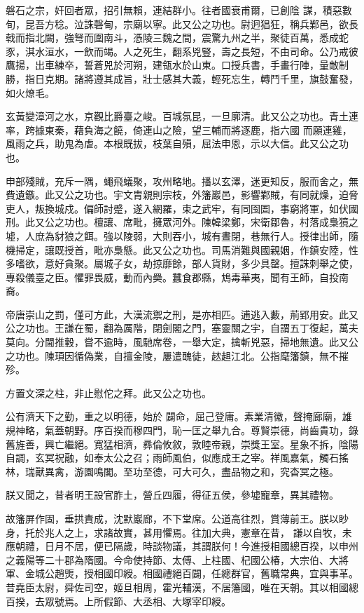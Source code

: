 \begin{pinyinscope}
 磐石之宗，奸回者眾，招引無賴，連結群小。往者國衰甫爾，已創陰
 謀，積惡數旬，昆吾方稔。泣誅磬甸，宗廟以寧。此又公之功也。尉迥猖狂，稱兵鄴邑，欲長戟而指北闕，強弩而圍南斗，憑陵三魏之間，震驚九州之半，聚徒百萬，悉成蛇豕，淇水洹水，一飲而竭。人之死生，翻系兇豎，壽之長短，不由司命。公乃戒彼鷹揚，出車練卒，誓蒼兕於河朔，建瓴水於山東。口授兵書，手畫行陣，量敵制勝，指日克期。諸將遵其成旨，壯士感其大義，輕死忘生，轉鬥千里，旗鼓奮發，如火燎毛。



 玄黃變漳河之水，京觀比爵臺之峻。百城氛昆，一旦廓清。此又公之功也。青土連率，跨據東秦，藉負海之饒，倚連山之險，望三輔而將逐鹿，指六國
 而願連雞，風雨之兵，助鬼為虐。本根既拔，枝葉自殞，屈法申恩，示以大信。此又公之功也。



 申部殘賊，充斥一隅，蠅飛蟻聚，攻州略地。播以玄澤，迷更知反，服而舍之，無費遺鏃。此又公之功也。宇文胄親則宗枝，外籓巖邑，影響鄴賊，有同就燥，迫脅吏人，叛換城戍。偏師討蹙，遂入網羅，束之武牢，有同囹圄，事窮將軍，如伏國刑。此又公之功也。檀讓、席毗，擁眾河外。陳韓梁鄭，宋衛鄒魯，村落成梟獍之墟，人庶為豺狼之餌。強以陵弱，大則吞小，城有晝閉，巷無行人。授律出師，隨機掃定，讓既授首，毗亦梟懸。此又公之功也。司馬消難與國親姻，作鎮安陸，性
 多嗜欲，意好貪聚。屬城子女，劫掠靡餘，部人貨財，多少具罄。擅誅刺舉之使，專殺儀臺之臣。懼罪畏威，動而內奰。蠶食郡縣，鴆毒華夷，聞有王師，自投南裔。



 帝唐崇山之罰，僅可方此，大漢流禦之刑，是亦相匹。逋逃入藪，荊郢用安。此又公之功也。王謙在蜀，翻為厲階，閉劍閣之門，塞靈關之宇，自謂五丁復起，萬夫莫向。分閫推轂，嘗不逾時，風馳席卷，一舉大定，擒斬兇惡，掃地無遺。此又公之功也。陳頊因循偽業，自擅金陵，屢遣醜徒，趑趄江北。公指麾籓鎮，無不摧殄。



 方置文深之柱，非止慰佗之拜。此又公之功也。



 公有濟天下之勤，重之以明德，始於
 闢命，屈己登庸。素業清徽，聲掩廊廟，雄規神略，氣蓋朝野。序百揆而穆四門，恥一匡之舉九合。尊賢崇德，尚齒貴功，錄舊旌善，興亡繼絕。寬猛相濟，彞倫攸敘，敦睦帝親，崇獎王室。星象不拆，陰陽自調，玄冥祝融，如奉太公之召；雨師風伯，似應成王之宰。祥風嘉氣，觸石搖林，瑞獸異禽，游園鳴閣。至功至德，可大可久，盡品物之和，究杳冥之極。



 朕又聞之，昔者明王設官胙土，營丘四履，得征五侯，參墟寵章，異其禮物。



 故籓屏作固，垂拱責成，沈默巖廊，不下堂席。公道高往烈，賞薄前王。朕以眇身，托於兆人之上，求諸故實，甚用懼焉。往加大典，憲章在昔，
 謙以自牧，未應朝禮，日月不居，便已隔歲，時談物議，其謂朕何！今進授相國總百揆，以申州之義陽等二十郡為隋國。今命使持節、太傅、上柱國、杞國公椿，大宗伯、大將軍、金城公趙煚，授相國印綬。相國禮絕百闢，任總群官，舊職常典，宜與事革。昔堯臣太尉，舜佐司空，姬旦相周，霍光輔漢，不居籓國，唯在天朝。其以相國總百揆，去眾號焉。上所假節、大丞相、大塚宰印綬。




\end{pinyinscope}
